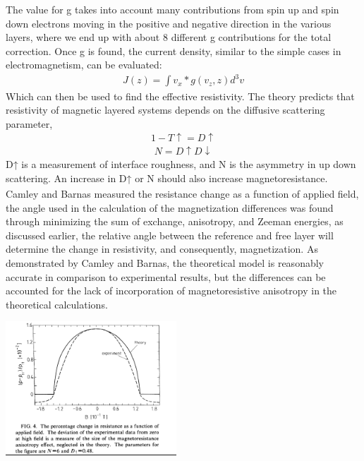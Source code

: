 \documentclass[11pt]{article}
\begin{document}
\begin{multicols}{2}
The value for g takes into account many contributions from spin up and spin down electrons moving in the positive and negative direction in the various layers, where we end up with about 8 different g contributions for the total correction. Once g is found, the current density, similar to  the simple cases in electromagnetism,  can be evaluated:
\begin{align*}
J(z) = \int v_x*g(v_z,z)d^3 v  
\end{align*}
Which can then be used to find the effective resistivity. The theory predicts that resistivity of magnetic layered systems depends on the diffusive scattering parameter, 
\begin{align*}
1-T \uparrow= D \uparrow
\end{align*}
\begin{align*}
N = D \uparrow D \downarrow 
\end{align*}
D↑ is a measurement of interface roughness, and N is the asymmetry in up down scattering. An increase in D↑ or N should also increase magnetoresistance\textsubscript{\cite{label2}}. Camley and Barnas measured the resistance change as a function of applied field, the angle used in the calculation of the magnetization differences was found through minimizing the sum of exchange, anisotropy, and Zeeman energies, as discussed earlier, the relative angle between the reference and free layer will determine the change in resistivity, and consequently, magnetization. As demonstrated by Camley and Barnas, the theoretical model is reasonably accurate in comparison to experimental results, but the differences can be accounted for the lack of incorporation of magnetoresistive anisotropy in the theoretical calculations. 

\begin{center}
	\centering
	\includegraphics[width=0.48\textwidth]{exp_vs_theory.png}
\end{center} 



\end{multicols}
\end{document}
